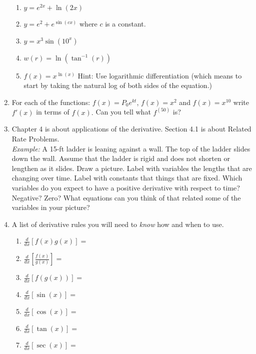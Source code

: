 \documentclass[11pt,fleqn]{article}
\begin{document}
\begin{enumerate}
	\begin{enumerate}
	\item $y=e^{2x}+\ln(2x)$
	\vspace{.5in}
	\item $y=e^2+e^{\sin(cx)}$ where $c$ is a constant.
	\vfill
	\item $y=x^3 \sin ( 10^x)$
	\vfill
	\item $w(r)= \ln( \tan^{-1}(r))$
	\vfill
	\item $f(x)=x^{\ln (x)}$ Hint: Use logarithmic differentiation (which means to start by taking the natural log of both sides of the equation.)
	\vfill
	\end{enumerate}
\item For each of the functions: $f(x)=P_0e^{kt}$, $f(x)=x^2$ and $f(x)=x^{10}$ write $f'(x)$ in terms of $f(x).$ Can you tell what $f^{(50)}$ is?
\vfill
\newpage
\item Chapter 4 is about applications of the derivative. Section 4.1 is about Related Rate Problems. \\
\emph{Example:} A 15-ft ladder is leaning against a wall. The top of the ladder slides down the wall. Assume that the ladder is rigid and does not shorten or lengthen as it slides. Draw a picture. Label with variables the lengths that are changing over time. Label with constants that things that are fixed. Which variables do you expect to have a positive derivative with respect to time? Negative? Zero? What equations can you think of that related some of the variables in your picture?\vfill
\item A list of derivative rules you will need to \emph{know}  how and when to use.
\begin{multicols}{2}
	\begin{enumerate}
	\item $\displaystyle{\frac{d}{dx} \left[ f(x) g(x)\right]=}$
	\item $\displaystyle{\frac{d}{dx} \left[ \frac{f(x)}{g(x)}\right]=}$
	\item $\displaystyle{\frac{d}{dx} \left[ f(g(x))\right]=}$
	\item $\displaystyle{\frac{d}{dx} \left[ \sin(x)\right]=}$
	\item $\displaystyle{\frac{d}{dx} \left[ \cos(x)\right]=}$
	\item $\displaystyle{\frac{d}{dx} \left[ \tan(x) \right]=}$
	\item $\displaystyle{\frac{d}{dx} \left[ \sec(x)\right]=}$

\end{enumerate}
\end{multicols}
\end{enumerate}
\end{document}
